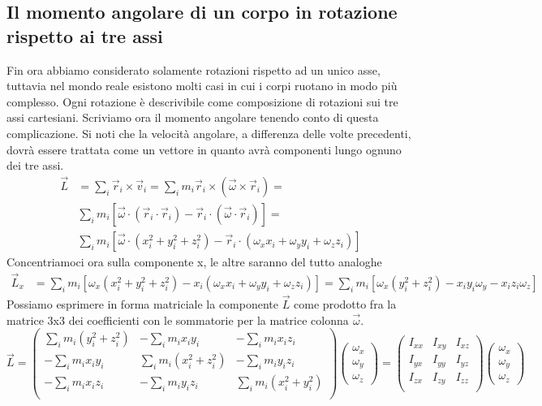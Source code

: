 \subsection{Il momento angolare di un corpo in rotazione rispetto ai tre assi}
Fin ora abbiamo considerato solamente rotazioni rispetto ad un unico asse, tuttavia nel mondo reale esistono molti casi in cui i corpi ruotano in modo più complesso. Ogni rotazione è descrivibile come composizione di rotazioni sui tre assi cartesiani. Scriviamo ora il momento angolare tenendo conto di questa complicazione. Si noti che la velocità angolare, a differenza delle volte precedenti, dovrà essere trattata come un vettore in quanto avrà componenti lungo ognuno dei tre assi.  
\begin{align*}
\vec{L} &= \sum_i \vec{r}_i \times \vec{v}_i = \sum_i m_i \vec{r}_i \times (\vec{\omega} \times \vec{r}_i) =\\
&\sum_i m_i[\vec{\omega}\cdot(\vec{r}_i\cdot \vec{r}_i)-\vec{r}_i\cdot(\vec{\omega} \cdot \vec{r}_i)] =\\
&\sum_i m_i[\vec{\omega}\cdot(x_i^2+y_i^2+z_i^2)-\vec{r}_i\cdot(\omega_x x_i+\omega_y y_i+\omega_z z_i)]
\end{align*}
Concentriamoci ora sulla componente x, le altre saranno del tutto analoghe
\begin{align*}
	\vec{L}_x &= \sum_i m_i[\omega_x(x_i^2+y_i^2+z_i^2)-x_i(\omega_x x_i+\omega_y y_i+\omega_z z_i)]= \sum_i m_i [\omega_x(y_i^2+z_i^2)-x_i y_i \omega_y-x_i z_i \omega_z]
\end{align*}
Possiamo esprimere in forma matriciale la componente $\vec{L}$ come prodotto fra la matrice 3x3 dei coefficienti con le sommatorie per la matrice colonna $\vec{\omega}$. 
\[ \vec{L} =
\begin{pmatrix}
	\sum_i m_i (y_i^2+z_i^2) & -\sum_i m_i x_i y_i        & -\sum_i m_i x_i z_i\\
	-\sum_i m_i x_i y_i      &  \sum_i m_i (x_i^2+ z_i^2) & -\sum_i m_i y_i z_i\\
	-\sum_i m_i x_i z_i      & -\sum_i m_i y_i z_i        & \sum_i m_i (x_i^2 + y_i^2)\\
\end{pmatrix}
\begin{pmatrix}
	\omega_x \\
	\omega_y \\
	\omega_z
\end{pmatrix}
= 
\begin{pmatrix}
	I_{xx} & I_{xy} & I_{xz}\\
	I_{yx} & I_{yy} & I_{yz}\\
	I_{zx} & I_{zy} & I_{zz}\\
\end{pmatrix}
\begin{pmatrix}
	\omega_x \\
	\omega_y \\
	\omega_z
\end{pmatrix}
\]
